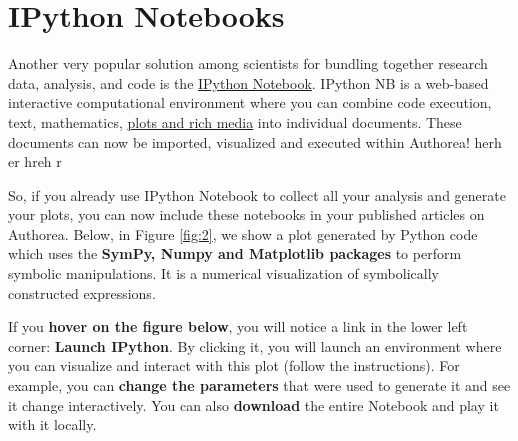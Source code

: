 \section{IPython Notebooks}
Another very popular solution among scientists for bundling together research data, analysis, and code is the \href{http://ipython.org/notebook.html}{IPython Notebook}. IPython NB is a web-based interactive computational environment where you can combine code execution, text, mathematics, \href{http://jakevdp.github.io/blog/2013/12/05/static-interactive-widgets/}{plots and rich media} into individual documents. These documents can now be imported, visualized and executed within Authorea! herh er hreh r 

So, if you already use IPython Notebook to collect all your analysis and generate your plots, you can now include these notebooks in your published articles on Authorea. Below, in Figure \ref{fig:2}, we show a plot generated by Python code which uses the \textbf{SymPy, Numpy and Matplotlib packages} to perform symbolic manipulations. It is a numerical visualization of symbolically constructed expressions.

If you \textbf{hover on the figure below}, you will notice a link in the lower left corner: \textbf{Launch IPython}. By clicking it, you will launch an environment where you can visualize and interact with this plot (follow the instructions). For example, you can \textbf{change the parameters} that were used to generate it and see it change interactively. You can also \textbf{download} the entire Notebook and play it with it locally.  